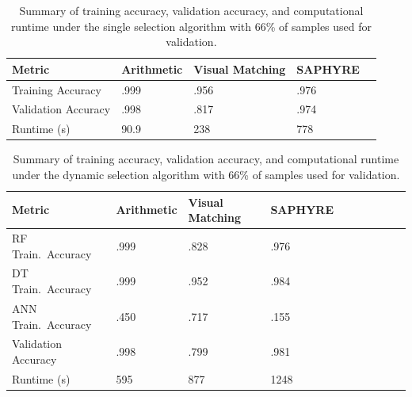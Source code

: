 \documentclass[12pt]{uthesis-v12}  %
\begin{document}
\begin{table}[!t]
\caption{Summary of training accuracy, validation accuracy, and computational runtime under the single selection algorithm with 66\% of samples used for validation.}
\renewcommand{\arraystretch}{1.3}
\centering
{\begin{tabular}{*{5}{l}}
\toprule
Metric & Arithmetic & Visual Matching & SAPHYRE \\ \midrule
Training Accuracy & .999 & .956 & .976 \\
Validation Accuracy & .998 & .817 & .974 \\
Runtime (s) & 90.9 & 238 & 778 \\ \bottomrule
\end{tabular}}

\label{single-all2}

\end{table}

\begin{table}[!t]
\caption{Summary of training accuracy, validation accuracy, and computational runtime under the dynamic selection algorithm with 66\% of samples used for validation.}
\renewcommand{\arraystretch}{1.3}
\centering
{\begin{tabular}{*{10}{l}}
\toprule
Metric & Arithmetic & Visual Matching & SAPHYRE \\ \midrule
RF Train.~Accuracy & .999 & .828 & .976 \\
DT Train.~Accuracy & .999 & .952 & .984 \\
ANN Train.~Accuracy & .450 & .717 & .155 \\
Validation Accuracy & .998 & .799 & .981 \\
Runtime (s) & 595 & 877 & 1248 \\ \bottomrule
\end{tabular}}

\label{dyn-all2}
\end{table}
	
\end{document}
